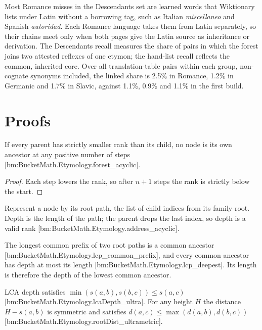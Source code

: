 \documentclass[11pt]{article}
\newcommand{\bm}[1]{{\small[bm:#1]}}
\begin{document}
Most Romance misses in the Descendants set are learned words that
Wiktionary lists under Latin without a borrowing tag, such as Italian
\emph{miscellaneo} and Spanish \emph{autoridad}. Each Romance language
takes them from Latin separately, so their chains meet only when both
pages give the Latin source as inheritance or derivation. The Descendants
recall measures the share of pairs in which the forest joins two attested reflexes of one
etymon; the hand-list recall reflects the common, inherited core. Over all
translation-table pairs within each group, non-cognate synonyms included,
the linked share is 2.5\% in Romance, 1.2\% in Germanic and 1.7\% in
Slavic, against 1.1\%, 0.9\% and 1.1\% in the first build.

\section{Proofs}
\label{sec:proofs}

\begin{theorem}[Acyclicity]
\label{thm:acyclic}
If every parent has strictly smaller rank than its child, no node is its
own ancestor at any positive number of steps
\bm{BucketMath.Etymology.forest\_acyclic}.
\end{theorem}

\begin{proof}
Each step lowers the rank, so after $n+1$ steps the rank is strictly
below the start.
\end{proof}

Represent a node by its root path, the list of child indices from its
family root. Depth is the length of the path; the parent drops the last
index, so depth is a valid rank \bm{BucketMath.Etymology.address\_acyclic}.

\begin{theorem}
\label{thm:lca}
The longest common prefix of two root paths is a common ancestor
\bm{BucketMath.Etymology.lcp\_common\_prefix}, and every common ancestor
has depth at most its length \bm{BucketMath.Etymology.lcp\_deepest}. Its
length is therefore the depth of the lowest common ancestor.
\end{theorem}

\begin{theorem}[Ultrametric]
\label{thm:ultra}
LCA depth satisfies $\min(s(a,b), s(b,c)) \le s(a,c)$
\bm{BucketMath.Etymology.lcaDepth\_ultra}. For any height $H$ the distance
$H - s(a,b)$ is symmetric and satisfies $d(a,c) \le \max(d(a,b), d(b,c))$
\bm{BucketMath.Etymology.rootDist\_ultrametric}.
\end{theorem}
\end{document}
